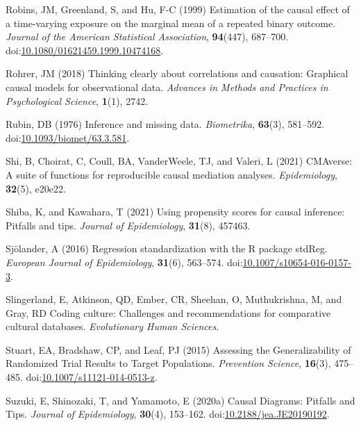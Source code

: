 \documentclass[
  singlecolumn,
  9pt]{article}
\begin{document}
\begin{CSLReferences}
Robins, JM, Greenland, S, and Hu, F-C (1999) Estimation of the causal
effect of a time-varying exposure on the marginal mean of a repeated
binary outcome. \emph{Journal of the American Statistical Association},
\textbf{94}(447), 687--700.
doi:\href{https://doi.org/10.1080/01621459.1999.10474168}{10.1080/01621459.1999.10474168}.

Rohrer, JM (2018) Thinking clearly about correlations and causation:
Graphical causal models for observational data. \emph{Advances in
Methods and Practices in Psychological Science}, \textbf{1}(1), 2742.

Rubin, DB (1976) Inference and missing data. \emph{Biometrika},
\textbf{63}(3), 581--592.
doi:\href{https://doi.org/10.1093/biomet/63.3.581}{10.1093/biomet/63.3.581}.

Shi, B, Choirat, C, Coull, BA, VanderWeele, TJ, and Valeri, L (2021)
CMAverse: A suite of functions for reproducible causal mediation
analyses. \emph{Epidemiology}, \textbf{32}(5), e20e22.

Shiba, K, and Kawahara, T (2021) Using propensity scores for causal
inference: Pitfalls and tips. \emph{Journal of Epidemiology},
\textbf{31}(8), 457463.

Sjölander, A (2016) Regression standardization with the R package
stdReg. \emph{European Journal of Epidemiology}, \textbf{31}(6),
563--574.
doi:\href{https://doi.org/10.1007/s10654-016-0157-3}{10.1007/s10654-016-0157-3}.

Slingerland, E, Atkinson, QD, Ember, CR, Sheehan, O, Muthukrishna, M,
and Gray, RD Coding culture: Challenges and recommendations for
comparative cultural databases. \emph{Evolutionary Human Sciences}.

Stuart, EA, Bradshaw, CP, and Leaf, PJ (2015) Assessing the
Generalizability of Randomized Trial Results to Target Populations.
\emph{Prevention Science}, \textbf{16}(3), 475--485.
doi:\href{https://doi.org/10.1007/s11121-014-0513-z}{10.1007/s11121-014-0513-z}.

Suzuki, E, Shinozaki, T, and Yamamoto, E (2020a) Causal Diagrams:
Pitfalls and Tips. \emph{Journal of Epidemiology}, \textbf{30}(4),
153--162.
doi:\href{https://doi.org/10.2188/jea.JE20190192}{10.2188/jea.JE20190192}.


\end{CSLReferences}
\end{document}
